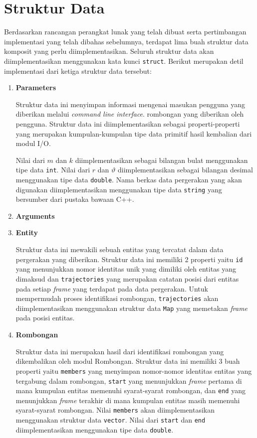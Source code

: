 \section{Struktur Data}
\label{sec:impl-struct}

Berdasarkan rancangan perangkat lunak yang telah dibuat serta pertimbangan implementasi yang telah dibahas sebelumnya, terdapat lima buah struktur data komposit yang perlu diimplementasikan. Seluruh struktur data akan diimplementasikan menggunakan kata kunci \texttt{struct}. Berikut merupakan detil implementasi dari ketiga struktur data tersebut:

\begin{enumerate}
    \item \textbf{Parameters}
    
    Struktur data ini menyimpan informasi mengenai masukan pengguna yang diberikan melalui \textit{command line interface}. rombongan yang diberikan oleh pengguna. Struktur data ini diimplementasikan sebagai properti-properti yang merupakan kumpulan-kumpulan tipe data primitif hasil kembalian dari modul I/O.
    
    Nilai dari $m$ dan $k$ diimplementasikan sebagai bilangan bulat menggunakan tipe data \texttt{int}. Nilai dari $r$ dan $\vartheta$ diimplementasikan sebagai bilangan desimal menggunakan tipe data \texttt{double}. Nama berkas data pergerakan yang akan digunakan diimplementasikan menggunakan tipe data \texttt{string} yang bersumber dari pustaka bawaan C++.
    
    \item \textbf{Arguments}
    
    \item \textbf{Entity}
    
    Struktur data ini mewakili sebuah entitas yang tercatat dalam data pergerakan yang diberikan. Struktur data ini memiliki 2 properti yaitu \texttt{id} yang menunjukkan nomor identitas unik yang dimiliki oleh entitas yang dimaksud dan \texttt{trajectories} yang merupakan catatan posisi dari entitas pada setiap \textit{frame} yang terdapat pada data pergerakan. Untuk mempermudah proses identifikasi rombongan, \texttt{trajectories} akan diimplementasikan menggunakan struktur data \texttt{Map} yang memetakan \textit{frame} pada posisi entitas.
    
    \item \textbf{Rombongan}
    
    Struktur data ini merupakan hasil dari identifikasi rombongan yang dikembalikan oleh modul Rombongan. Struktur data ini memiliki 3 buah properti yaitu \texttt{members} yang menyimpan nomor-nomor identitas entitas yang tergabung dalam rombongan, \texttt{start} yang menunjukkan \textit{frame} pertama di mana kumpulan entitas memenuhi syarat-syarat rombongan, dan \texttt{end} yang menunjukkan \textit{frame} terakhir di mana kumpulan entitas masih memenuhi syarat-syarat rombongan. Nilai \texttt{members} akan diimplementasikan menggunakan struktur data \texttt{vector}. Nilai dari \texttt{start} dan \texttt{end} diimplementasikan menggunakan tipe data \texttt{double}.
\end{enumerate}

